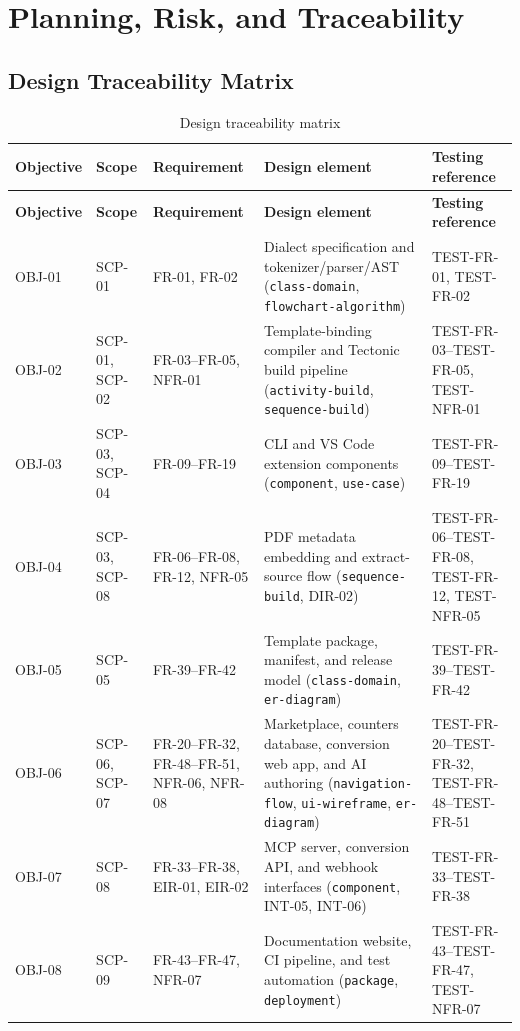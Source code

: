 
\chapter{Planning, Risk, and Traceability}
\label{chap:planning}

\section{Design Traceability Matrix}
\begin{xltabular}{\textwidth}{@{}p{0.09\textwidth}p{0.13\textwidth}p{0.21\textwidth}X p{0.18\textwidth}@{}}
\caption{Design traceability matrix}\label{tab:traceability}\\
\toprule
\textbf{Objective} & \textbf{Scope} & \textbf{Requirement} & \textbf{Design element} & \textbf{Testing reference} \\
\midrule
\endfirsthead
\toprule
\textbf{Objective} & \textbf{Scope} & \textbf{Requirement} & \textbf{Design element} & \textbf{Testing reference} \\
\midrule
\endhead
OBJ-01 & SCP-01 & FR-01, FR-02 & Dialect specification and tokenizer/parser/AST (\texttt{class-domain}, \texttt{flowchart-algorithm}) & TEST-FR-01, TEST-FR-02 \\
OBJ-02 & SCP-01, SCP-02 & FR-03--FR-05, NFR-01 & Template-binding compiler and Tectonic build pipeline (\texttt{activity-build}, \texttt{sequence-build}) & TEST-FR-03--TEST-FR-05, TEST-NFR-01 \\
OBJ-03 & SCP-03, SCP-04 & FR-09--FR-19 & CLI and VS Code extension components (\texttt{component}, \texttt{use-case}) & TEST-FR-09--TEST-FR-19 \\
OBJ-04 & SCP-03, SCP-08 & FR-06--FR-08, FR-12, NFR-05 & PDF metadata embedding and extract-source flow (\texttt{sequence-build}, DIR-02) & TEST-FR-06--TEST-FR-08, TEST-FR-12, TEST-NFR-05 \\
OBJ-05 & SCP-05 & FR-39--FR-42 & Template package, manifest, and release model (\texttt{class-domain}, \texttt{er-diagram}) & TEST-FR-39--TEST-FR-42 \\
OBJ-06 & SCP-06, SCP-07 & FR-20--FR-32, FR-48--FR-51, NFR-06, NFR-08 & Marketplace, counters database, conversion web app, and AI authoring (\texttt{navigation-flow}, \texttt{ui-wireframe}, \texttt{er-diagram}) & TEST-FR-20--TEST-FR-32, TEST-FR-48--TEST-FR-51 \\
OBJ-07 & SCP-08 & FR-33--FR-38, EIR-01, EIR-02 & MCP server, conversion API, and webhook interfaces (\texttt{component}, INT-05, INT-06) & TEST-FR-33--TEST-FR-38 \\
OBJ-08 & SCP-09 & FR-43--FR-47, NFR-07 & Documentation website, CI pipeline, and test automation (\texttt{package}, \texttt{deployment}) & TEST-FR-43--TEST-FR-47, TEST-NFR-07 \\
\bottomrule
\end{xltabular}

